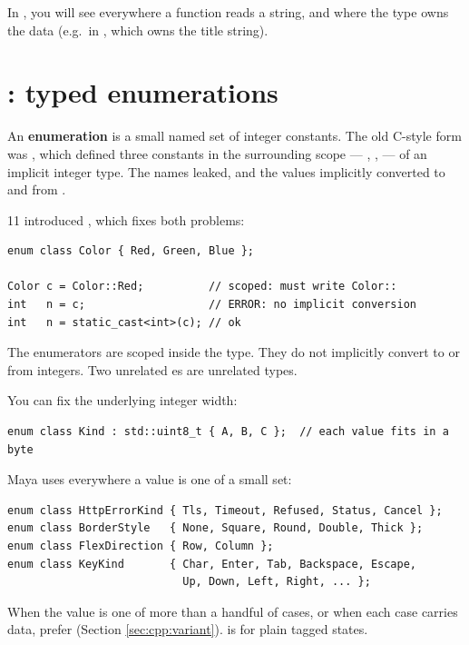 In \maya{}, you will see  everywhere a
function reads a string, and  where the type owns
the data (e.g.\ in , which owns the title
string).

\section{: typed enumerations}
\label{sec:cpp:enum}

An \textbf{enumeration} is a small named set of integer constants.
The old C-style form was ,
which defined three constants in the surrounding scope --- ,
,  --- of an implicit integer type. The names
leaked, and the values implicitly converted to and from .

\cpp{}11 introduced , which fixes both problems:

\begin{lstlisting}
enum class Color { Red, Green, Blue };

Color c = Color::Red;          // scoped: must write Color::
int   n = c;                   // ERROR: no implicit conversion
int   n = static_cast<int>(c); // ok
\end{lstlisting}

The enumerators are scoped inside the  type. They do not
implicitly convert to or from integers. Two unrelated
es are unrelated types.

You can fix the underlying integer width:

\begin{lstlisting}
enum class Kind : std::uint8_t { A, B, C };  // each value fits in a byte
\end{lstlisting}

Maya uses  everywhere a value is one of a small
set:

\begin{lstlisting}
enum class HttpErrorKind { Tls, Timeout, Refused, Status, Cancel };
enum class BorderStyle   { None, Square, Round, Double, Thick };
enum class FlexDirection { Row, Column };
enum class KeyKind       { Char, Enter, Tab, Backspace, Escape,
                           Up, Down, Left, Right, ... };
\end{lstlisting}

When the value is one of more than a handful of cases, or when each
case carries data, prefer  (Section
\ref{sec:cpp:variant}).  is for plain tagged states.

